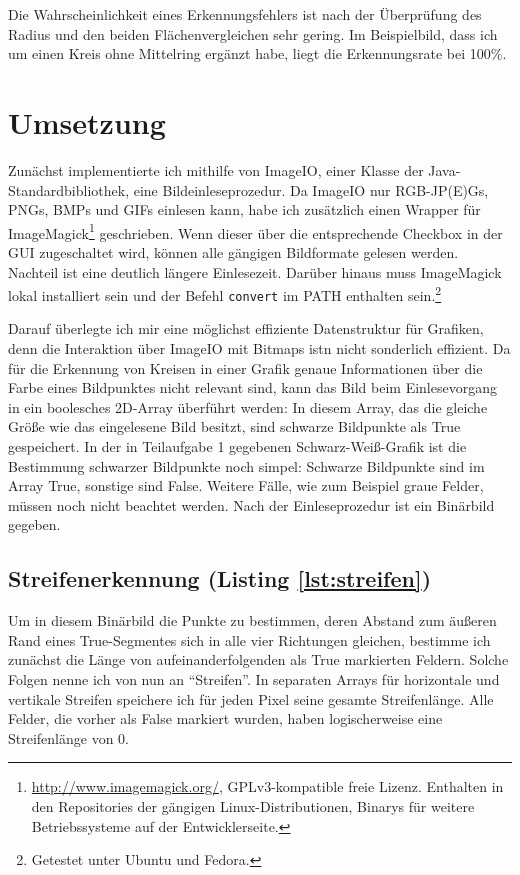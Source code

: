 Die Wahrscheinlichkeit eines Erkennungsfehlers ist nach der Überprüfung des Radius und den beiden Flächenvergleichen sehr gering. Im Beispielbild, dass ich um einen Kreis ohne Mittelring ergänzt habe, liegt die Erkennungsrate bei 100\%.

\section{Umsetzung}
Zunächst implementierte ich mithilfe von ImageIO, einer Klasse der Java-Standardbibliothek, eine Bildeinleseprozedur. Da ImageIO nur RGB-JP(E)Gs, PNGs, BMPs und GIFs einlesen kann, habe ich zusätzlich einen Wrapper für ImageMagick\footnote{\url{http://www.imagemagick.org/}, GPLv3-kompatible freie Lizenz. Enthalten in den Repositories der gängigen Linux-Distributionen, Binarys für weitere Betriebssysteme auf der Entwicklerseite.} geschrieben. 
Wenn dieser über die entsprechende Checkbox in der GUI zugeschaltet wird, können alle gängigen Bildformate gelesen werden. 
Nachteil ist eine deutlich längere Einlesezeit. Darüber hinaus muss ImageMagick lokal installiert sein und der Befehl \texttt{convert} im PATH enthalten sein.\footnote{Getestet unter Ubuntu und Fedora.} 

Darauf überlegte ich mir eine möglichst effiziente Datenstruktur für Grafiken, denn die Interaktion über ImageIO mit Bitmaps istn nicht sonderlich effizient. Da für die Erkennung von Kreisen in einer Grafik genaue Informationen über die Farbe eines Bildpunktes nicht relevant sind, kann das Bild beim Einlesevorgang in ein boolesches 2D-Array überführt werden: In diesem Array, das die gleiche Größe wie das eingelesene Bild besitzt, sind schwarze Bildpunkte als True gespeichert.
In der in Teilaufgabe 1 gegebenen Schwarz-Weiß-Grafik ist die Bestimmung schwarzer Bildpunkte noch simpel: Schwarze Bildpunkte sind im Array True, sonstige sind False. Weitere Fälle, wie zum Beispiel graue Felder, müssen noch nicht beachtet werden.
Nach der Einleseprozedur ist ein Binärbild gegeben.

\subsection{Streifenerkennung (Listing \ref{lst:streifen})}
Um in diesem Binärbild die Punkte zu bestimmen, deren Abstand zum äußeren Rand eines True-Segmentes sich in alle vier Richtungen gleichen, bestimme ich zunächst die Länge von aufeinanderfolgenden als True markierten Feldern. Solche Folgen nenne ich von nun an "`Streifen"'. In separaten Arrays für horizontale und vertikale Streifen speichere ich für jeden Pixel seine gesamte Streifenlänge.
Alle Felder, die vorher als False markiert wurden, haben logischerweise eine Streifenlänge von 0. 

